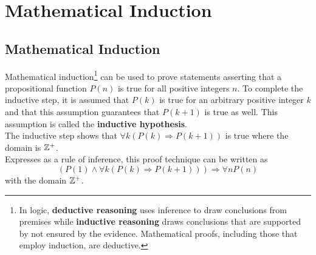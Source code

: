 \documentclass[./Discrete Math.tex]{subfiles}
\begin{document}
	\section{Mathematical Induction}
		\setcounter{subsection}{1}
		\subsection{Mathematical Induction}
			Mathematical induction\footnote{In logic, \textbf{deductive reasoning} uses inference to draw conclusions from premises while \textbf{inductive reasoning} draws conclusions that are supported by not ensured by the evidence. Mathematical proofs, including those that employ induction, are deductive.} can be used to prove statements asserting that a propositional function \(P(n)\) is true for all positive integers \(n\).
			To complete the inductive step, it is assumed that \(P(k)\) is true for an arbitrary positive integer \(k\) and that this assumption guarantees that \(P(k + 1)\) is true as well. This assumption is called the \textbf{inductive hypothesis}. \\
			The inductive step shows that \(\forall k(P(k) \Rightarrow P(k + 1))\) is true where the domain is \(\mathbb{Z}^+\). \\
			Expresses as a rule of inference, this proof technique can be written as
				\[(P(1) \land \forall k(P(k) \Rightarrow P(k + 1))) \Rightarrow \forall nP(n)\]
				with the domain \(\mathbb{Z}^+\).
		\setcounter{subsection}{4}
\end{document}
